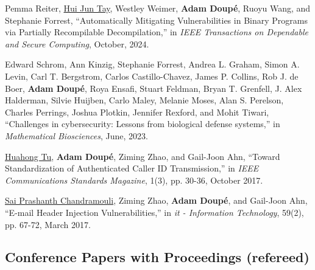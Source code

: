 \documentclass[11pt,letterpaper,sans]{moderncv}
\begin{document}
\begin{etaremune}

\item Pemma Reiter, \underline{Hui Jun Tay},  Westley Weimer,  \textbf{Adam Doup\'e},  Ruoyu Wang, and  Stephanie Forrest, ``Automatically Mitigating Vulnerabilities in Binary Programs via Partially Recompilable Decompilation,'' in \emph{IEEE Transactions on Dependable and Secure Computing}, October, 2024.

\item Edward Schrom, Ann Kinzig, Stephanie Forrest, Andrea L. Graham, Simon A. Levin, Carl T. Bergstrom, Carlos Castillo-Chavez, James P. Collins, Rob J. de Boer, \textbf{Adam Doup\'e}, Roya Ensafi, Stuart Feldman, Bryan T. Grenfell, J. Alex Halderman, Silvie Huijben, Carlo Maley, Melanie Moses, Alan S. Perelson, Charles Perrings, Joshua Plotkin, Jennifer Rexford, and Mohit Tiwari, ``Challenges in cybersecurity: Lessons from biological defense systems,'' in \emph{Mathematical Biosciences}, June, 2023.

\item \underline{Huahong Tu}, \textbf{Adam Doup\'e}, Ziming Zhao, and
  Gail-Joon Ahn, ``Toward Standardization of Authenticated Caller ID
  Transmission,'' in \emph{IEEE Communications Standards Magazine},
    1(3), pp. 30-36, October 2017.

\item \underline{Sai Prashanth Chandramouli}, Ziming Zhao,
  \textbf{Adam Doup\'e}, and Gail-Joon Ahn, ``E-mail Header Injection
  Vulnerabilities,'' in \emph{it - Information Technology}, 59(2), pp.
  67-72, March 2017.

\end{etaremune}

\subsection{Conference Papers with Proceedings (refereed)}
\end{document}
